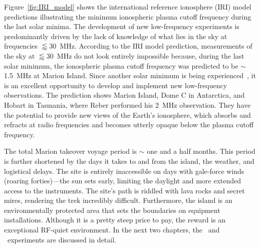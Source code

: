 Figure~\ref{fig:IRI_model} shows the international reference ionosphere (IRI) model~\citep{ars-16-1-2018} predictions illustrating the minimum ionospheric plasma cutoff frequency during the last solar minima. The development of new low-frequency experiments is predominantly driven by the lack of knowledge of what lies in the sky at frequencies $\lessapprox$\SI{30}{\mega\hertz}.  According to the IRI model prediction, measurements of the sky at $\lessapprox$\SI{30}{\mega\hertz} do not look entirely impossible because, during the last solar minimum, the ionospheric plasma cutoff frequency was predicted to be $\sim$\SI{1.5}{\mega\hertz} at Marion Island. Since another solar minimum is being experienced~\citep{2018NatCo...9.5209B}, it is an excellent opportunity to develop and implement new low-frequency observations. The prediction shows Marion Island, Dome C in Antarctica, and Hobart in Tasmania, where Reber performed his \SI{2}{\mega\hertz} observation. They have the potential to provide new views of the Earth's ionosphere, which absorbs and refracts at radio frequencies and becomes utterly opaque below the plasma cutoff frequency. 

The total Marion takeover voyage period is $\sim$ one and a half months. This period is further shortened by the days it takes to and from the island, the weather, and logistical delays. The site is entirely inaccessible on days with gale-force winds (roaring forties)—the sun sets early, limiting the daylight and more extended access to the instruments. The site's path is riddled with lava rocks and secret mires, rendering the trek incredibly difficult. Furthermore, the island is an environmentally protected area that sets the boundaries on equipment installations. Although it is a pretty steep price to pay, the reward is an exceptional RF-quiet environment. In the next two chapters, the \prizm\ and \albatros\ experiments are discussed in detail.

